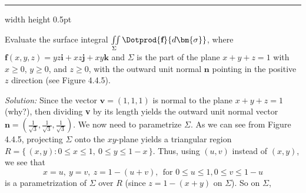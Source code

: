 \vspace{3mm}
\hrule width \textwidth height 0.5pt
\begin{exa}\label{exa:surfintex}
 Evaluate the surface integral $\iint\limits_{\Sigma} \Dotprod{\textbf{f}}{d\bm{\sigma}}$, where
 $\textbf{f}(x,y,z) = yz\textbf{i} + xz\textbf{j} + xy\textbf{k}$ and $\Sigma$ is the part of the plane $x+y+z=1$
 with $x \ge 0$, $y \ge 0$, and $z \ge 0$, with the outward unit normal $\textbf{n}$ pointing in the positive $z$
 direction (see Figure 4.4.5).\vspace{0.5mm}
 \piccaption[]{}
 \par\noindent \emph{Solution:} Since the vector $\textbf{v} = (1,1,1)$ is normal to the plane $x+y+z=1$ (why?), then
 dividing \textbf{v} by its length yields the outward unit normal vector $\textbf{n} = \left( \frac{1}{\sqrt{3}},
 \frac{1}{\sqrt{3}},\frac{1}{\sqrt{3}} \right)$. We now need to parametrize $\Sigma$. As we can see from Figure 4.4.5,
 projecting $\Sigma$ onto the $xy$-plane yields a triangular region
 $R= \lbrace\,(x,y): 0 \le x \le 1,~ 0 \le y \le 1-x\,\rbrace$. Thus, using $(u,v)$ instead of $(x,y)$, we see that
 \begin{displaymath}
  x=u,~ y=v,~ z=1-(u+v),~~\text{for~} 0 \le u \le 1, 0 \le v \le 1-u
 \end{displaymath}
 is a parametrization of $\Sigma$ over $R$ (since $z=1-(x+y)$ on $\Sigma$). So on $\Sigma$,

\end{exa}
